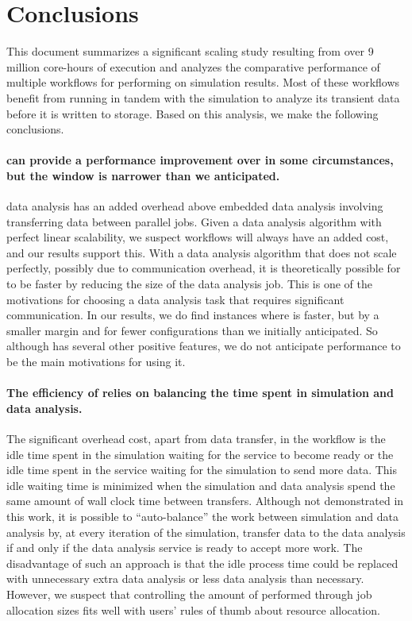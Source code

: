 \section{Conclusions}
\label{sec:Conclusion}

This document summarizes a significant scaling study resulting from over 9
million core-hours of execution and analyzes the comparative performance of
multiple workflows for performing \vda on simulation results.  Most of
these workflows benefit from running in tandem with the simulation to
analyze its transient data before it is written to storage.  Based on this
analysis, we make the following conclusions.

\paragraph{\Intransit can provide a performance improvement over \insitu in
  some circumstances, but the window is narrower than we anticipated.}
\Intransit data analysis has an added overhead above embedded \insitu data
analysis involving transferring data between parallel jobs.  Given a data
analysis algorithm with perfect linear scalability, we suspect \intransit
workflows will always have an added cost, and our results support this.
With a data analysis algorithm that does not scale perfectly, possibly due
to communication overhead, it is theoretically possible for \intransit to
be faster by reducing the size of the data analysis job.  This is one of
the motivations for choosing a data analysis task that requires significant
communication.  In our results, we do find instances where \intransit is
faster, but by a smaller margin and for fewer configurations than we
initially anticipated.  So although \intransit has several other positive
features, we do not anticipate performance to be the main motivations for
using it.

\paragraph{The efficiency of \intransit relies on balancing the time spent
  in simulation and data analysis.}  The significant overhead cost, apart
from data transfer, in the \intransit workflow is the idle time spent in
the simulation waiting for the \vda service to become ready or the idle
time spent in the \vda service waiting for the simulation to send more
data.  This idle waiting time is minimized when the simulation and data
analysis spend the same amount of wall clock time between transfers.
Although not demonstrated in this work, it is possible to ``auto-balance''
the work between simulation and data analysis by, at every iteration of the
simulation, transfer data to the data analysis if and only if the data
analysis service is ready to accept more work.  The disadvantage of such an
approach is that the idle process time could be replaced with unnecessary
extra data analysis or less data analysis than necessary.  However, we
suspect that controlling the amount of \vda performed through job
allocation sizes fits well with users' rules of thumb about resource
allocation.

